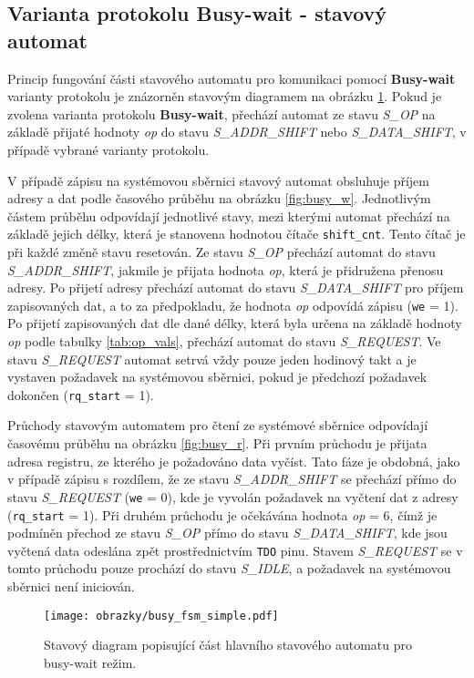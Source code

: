 \subsection{Varianta protokolu Busy-wait - stavový automat} \label{subsec:busy-wait-fsm}
Princip fungování části stavového automatu pro komunikaci pomocí \textbf{Busy-wait} varianty protokolu je znázorněn stavovým diagramem na obrázku \ref{fig:busy_wait_fsm}. Pokud je zvolena varianta protokolu \textbf{Busy-wait}, přechází automat ze stavu \textit{S\_OP} na základě přijaté hodnoty \textit{op} do stavu \textit{S\_ADDR\_SHIFT} nebo \textit{S\_DATA\_SHIFT}, v případě vybrané varianty protokolu.

V případě zápisu na systémovou sběrnici stavový automat obsluhuje příjem adresy a dat podle časového průběhu na obrázku \ref{fig:busy_w}. Jednotlivým částem průběhu odpovídají jednotlivé stavy, mezi kterými automat přechází na základě jejich délky, která je stanovena hodnotou čítače \texttt{shift\_cnt}. Tento čítač je při každé změně stavu resetován. Ze stavu \textit{S\_OP} přechází automat do stavu \textit{S\_ADDR\_SHIFT}, jakmile je přijata hodnota \textit{op}, která je přidružena přenosu adresy. Po přijetí adresy přechází automat do stavu \textit{S\_DATA\_SHIFT} pro příjem zapisovaných dat, a to za předpokladu, že hodnota \textit{op} odpovídá zápisu (\texttt{we} = 1). Po přijetí zapisovaných dat dle dané délky, která byla určena na základě hodnoty \textit{op} podle tabulky \ref{tab:op_vals}, přechází automat do stavu \textit{S\_REQUEST}. Ve stavu \textit{S\_REQUEST} automat setrvá vždy pouze jeden hodinový takt a je vystaven požadavek na systémovou sběrnici, pokud je předchozí požadavek dokončen (\texttt{rq\_start} = 1).

Průchody stavovým automatem pro čtení ze systémové sběrnice odpovídají časovému průběhu na obrázku \ref{fig:busy_r}. Při prvním průchodu je přijata adresa registru, ze kterého je požadováno data vyčíst. Tato fáze je obdobná, jako v případě zápisu s rozdílem, že ze stavu \textit{S\_ADDR\_SHIFT} se přechází přímo do stavu \textit{S\_REQUEST} (\texttt{we} = 0), kde je vyvolán požadavek na vyčtení dat z adresy (\texttt{rq\_start} = 1). Při druhém průchodu je očekávána hodnota \textit{op} = 6, čímž je podmíněn přechod ze stavu \textit{S\_OP} přímo do stavu \textit{S\_DATA\_SHIFT}, kde jsou vyčtená data odeslána zpět prostřednictvím \texttt{\acs{TDO}} pinu. Stavem \textit{S\_REQUEST} se v tomto průchodu pouze prochází do stavu \textit{S\_IDLE}, a požadavek na systémovou sběrnici není iniciován.

\begin{figure}[!h]
  \begin{center}
    \texttt{[image: obrazky/busy\_fsm\_simple.pdf]}
  \end{center}
  \caption{Stavový diagram popisující část hlavního stavového automatu pro busy-wait režim.}
	\label{fig:busy_wait_fsm}
\end{figure}